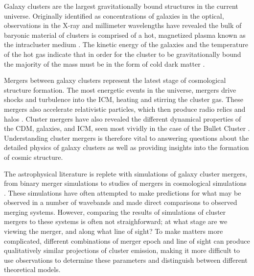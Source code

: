 \documentclass{emulateapj}
\begin{document}
Galaxy clusters are the largest gravitationally bound structures in the current universe. Originally identified as concentrations of galaxies in the optical, observations in the X-ray and millimeter wavelengths have revealed the bulk of baryonic material of clusters is comprised of a hot, magnetized plasma known as the intracluster medium \citep[ICM,][]{for72,sun72}. The kinetic energy of the galaxies and the temperature of the hot gas indicate that in order for the cluster to be gravitationally bound the majority of the mass must be in the form of cold dark matter \citep[CDM, first noted by][]{zwi37}.

Mergers between galaxy clusters represent the latest stage of cosmological structure formation. The most energetic events in the universe, mergers drive shocks and turbulence into the ICM, heating and stirring the cluster gas. These mergers also accelerate relativistic particles, which then produce radio relics and halos \citep{fer05,bru07,vwe10,bru12}. Cluster mergers have also revealed the different dynamical properties of the CDM, galaxies, and ICM, seen most vividly in the case of the Bullet Cluster \citep[][]{clo04,mar04}. Understanding cluster mergers is therefore vital to answering questions about the detailed physics of galaxy clusters as well as providing insights into the formation of cosmic structure.

The astrophysical literature is replete with simulations of galaxy cluster mergers, from binary merger simulations \citep[e.g.][]{ric01,poo06,zuh11a,don13} to studies of mergers in cosmological simulations \citep[e.g.][]{vaz09,ski13,yu15}. These simulations have often attempted to make predictions for what may be observed in a number of wavebands and made direct comparisons to observed merging systems. However, comparing the results of simulations of cluster mergers to these systems is often not straighforward; at what stage are we viewing the merger, and along what line of sight? To make matters more complicated, different combinations of merger epoch and line of sight can produce qualitatively similar projections of cluster emission, making it more difficult to use observations to determine these parameters and distinguish between different theoretical models.
\end{document}
